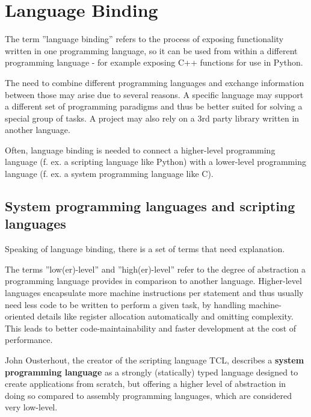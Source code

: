 \chapter{Language Binding}

The term ''language binding'' refers to the process of exposing functionality written in one programming language, so it can be used from within a different programming language - for example exposing C++ functions for use in Python.

The need to combine different programming languages and exchange information between those may arise due to several reasons. A specific language may support a different set of programming paradigms and thus be better suited for solving a special group of tasks. A project may also rely on a 3rd party library written in another language.

Often, language binding is needed to connect a higher-level programming language (f. ex. a scripting language like Python) with a lower-level programming language (f. ex. a system programming language like C).

\section{System programming languages and scripting languages}

Speaking of language binding, there is a set of terms that need explanation.

The terms ''low(er)-level'' and ''high(er)-level'' refer to the degree of abstraction a programming language provides in comparison to another language. Higher-level languages encapsulate more machine instructions per statement and thus usually need less code to be written to perform a given task, by handling machine-oriented details like register allocation automatically and omitting complexity. This leads to better code-maintainability and faster development at the cost of performance. 

John Ousterhout, the creator of the scripting language TCL, describes a \textbf{system programming language} as a strongly (statically) typed language designed to create applications from scratch, but offering a higher level of abstraction in doing so compared to assembly programming languages, which are considered very low-level.

